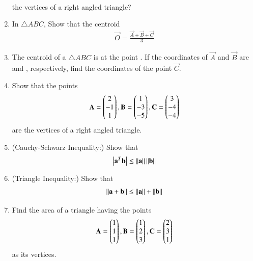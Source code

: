 \begin{enumerate}[label=\arabic*.,ref=\thesubsection.\theenumi]
\begin{align}
\end{align}
%
the vertices of a right angled triangle?
%
\item In $\triangle ABC$, Show that the centroid 
\begin{align}
\vec{O} = \frac{\vec{A}+\vec{B}+\vec{C}}{3}
\end{align}
%
\item The centroid of a $\triangle ABC$ is at the point .  If the coordinates of $\vec{A}$ and $\vec{B}$ are  and , respectively, find the coordinates of the point $\vec{C}$.
%
\item Show that the points 
\begin{align}
\mathbf{A} = \begin{pmatrix}2\\-1 \\1\end{pmatrix},
\mathbf{B} = \begin{pmatrix}1\\-3 \\-5\end{pmatrix},
\mathbf{C} = \begin{pmatrix}3\\ -4\\-4\end{pmatrix}
\end{align}
%
are the vertices of a right angled triangle.
%
\item (Cauchy-Schwarz Inequality:) Show that 
%
\begin{align}
\left\vert\mathbf{a}^T\mathbf{b}\right\vert \le \left\lVert\mathbf{a}\right\rVert\left\lVert\mathbf{b}\right\rVert
\end{align}
%
%
\item (Triangle Inequality:) Show that 
%
\begin{align}
\left\lVert\mathbf{a}+\mathbf{b}\right\rVert \le \left\lVert\mathbf{a}\right\rVert+\left\lVert\mathbf{b}\right\rVert
\end{align}
%
\item Find the area of a triangle having the points
%
\begin{align}
\mathbf{A} = \begin{pmatrix}1\\1 \\1\end{pmatrix},
\mathbf{B} = \begin{pmatrix}1\\2 \\3\end{pmatrix},
\mathbf{C} = \begin{pmatrix}2\\ 3\\1\end{pmatrix}
\end{align}
%
as its vertices.

\end{enumerate}
%
